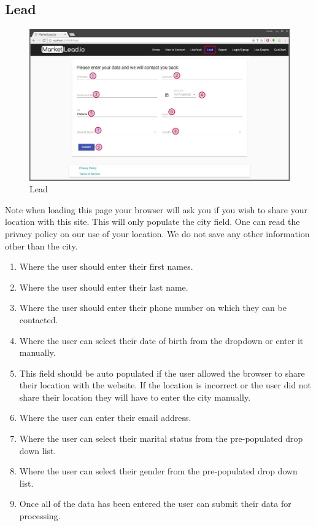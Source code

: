 \documentclass{article}
\begin{document}
		\subsection{Lead}
			\begin{figure}[H]
				\includegraphics[width=\textwidth]{images/lead.jpg}
				\caption{Lead}
				\label{fig:lead}
			\end{figure}
			Note when loading this page your browser will ask you if you wish to share your location with this site. This will only populate the city field. One can read the privacy policy on our use of your location. We do not save any other information other than the city.
			\begin{enumerate}
				\item Where the user should enter their first names.
				\item Where the user should enter their last name.
				\item Where the user should enter their phone number on which they can be contacted.
				\item Where the user can select their date of birth from the dropdown or enter it manually.
				\item This field should be auto populated if the user allowed the browser to share their location with the website. If the location is incorrect or the user did not share their location they will have to enter the city manually.
				\item Where the user can enter their email address.
				\item Where the user can select their marital status from the pre-populated drop down list.
				\item Where the user can select their gender from the pre-populated drop down list.
				\item Once all of the data has been entered the user can submit their data for processing.
			\end{enumerate}
\end{document}
